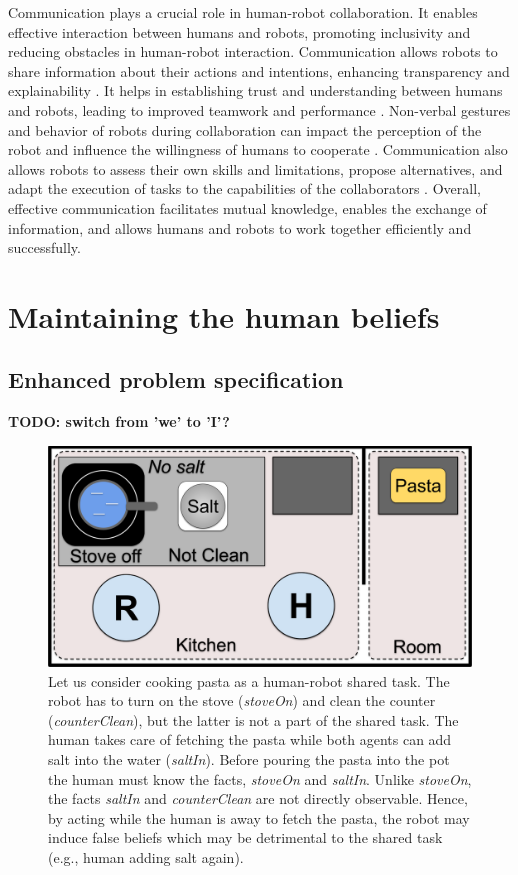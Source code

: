     Communication plays a crucial role in human-robot collaboration. It enables effective interaction between humans and robots, promoting inclusivity and reducing obstacles in human-robot interaction. Communication allows robots to share information about their actions and intentions, enhancing transparency and explainability \cite{mcmillan_human-robot_2023}. It helps in establishing trust and understanding between humans and robots, leading to improved teamwork and performance \cite{verhagen_influence_2022}. Non-verbal gestures and behavior of robots during collaboration can impact the perception of the robot and influence the willingness of humans to cooperate \cite{arntz_collaborating_2022}. Communication also allows robots to assess their own skills and limitations, propose alternatives, and adapt the execution of tasks to the capabilities of the collaborators \cite{ferrari_bidirectional_2022}. Overall, effective communication facilitates mutual knowledge, enables the exchange of information, and allows humans and robots to work together efficiently and successfully.


\section{Maintaining the human beliefs}

    \subsection{Enhanced problem specification}

\textbf{TODO: switch from 'we' to 'I'?}

\begin{figure}[t!]
    \centering
    \includegraphics[width=0.70\linewidth]{images/Chapter3/cooking_task_draw.png}
    \caption{
    Let us consider cooking pasta as a human-robot shared task. 
    The robot has to turn on the stove (\textit{stoveOn}) and clean the counter (\textit{counterClean}), but the latter is not a part of the shared task. The human takes care of fetching the pasta while both agents can add salt into the water (\textit{saltIn}). Before pouring the pasta into the pot the human must know the facts, \textit{stoveOn} and \textit{saltIn}. 
    Unlike \textit{stoveOn}, the facts \textit{saltIn} and \textit{counterClean} are not directly observable. 
    Hence, by acting while the human is away to fetch the pasta, the robot may induce false beliefs which may be detrimental to the shared task (e.g., human adding salt again).
    }
    \label{fig:new_scene}
\end{figure}

